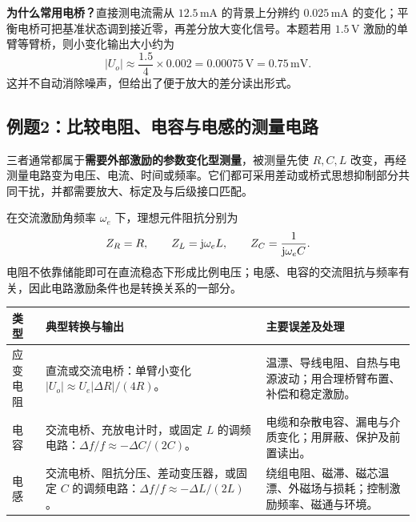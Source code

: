 \textbf{为什么常用电桥？}直接测电流需从 $12.5\,\mathrm{mA}$ 的背景上分辨约 $0.025\,\mathrm{mA}$ 的变化；平衡电桥可把基准状态调到接近零，再差分放大变化信号。本题若用 $1.5\,\mathrm V$ 激励的单臂等臂桥，则小变化输出大小约为
\[
|U_o|\approx\frac{1.5}{4}\times0.002
=0.00075\,\mathrm V=0.75\,\mathrm{mV}.
\]
这并不自动消除噪声，但给出了便于放大的差分读出形式。


\Needspace{8cm}
\subsection{例题2：比较电阻、电容与电感的测量电路}


\sol
三者通常都属于\textbf{需要外部激励的参数变化型测量}，被测量先使 $R,C,L$ 改变，再经测量电路变为电压、电流、时间或频率。它们都可采用差动或桥式思想抑制部分共同干扰，并都需要放大、标定及与后级接口匹配。

在交流激励角频率 $\omega_e$ 下，理想元件阻抗分别为
\[
Z_R=R,\qquad Z_L=\mathrm{j}\omega_eL,\qquad
Z_C=\frac{1}{\mathrm{j}\omega_eC}.
\]
电阻不依靠储能即可在直流稳态下形成比例电压；电感、电容的交流阻抗与频率有关，因此电路激励条件也是转换关系的一部分。

\begin{table}[H]
\centering\small
\begin{tabularx}{\linewidth}{@{}p{1.7cm} X X@{}}
\toprule
类型 & 典型转换与输出 & 主要误差及处理 \\
\midrule
应变电阻 & 直流或交流电桥：单臂小变化 $|U_o|\approx U_e|\Delta R|/(4R)$。 & 温漂、导线电阻、自热与电源波动；用合理桥臂布置、补偿和稳定激励。 \\
电容 & 交流电桥、充放电计时，或固定 $L$ 的调频电路：$\Delta f/f\approx-\Delta C/(2C)$。 & 电缆和杂散电容、漏电与介质变化；用屏蔽、保护及前置读出。 \\
电感 & 交流电桥、阻抗分压、差动变压器，或固定 $C$ 的调频电路：$\Delta f/f\approx-\Delta L/(2L)$。 & 绕组电阻、磁滞、磁芯温漂、外磁场与损耗；控制激励频率、磁通与环境。 \\
\bottomrule
\end{tabularx}
\end{table}

